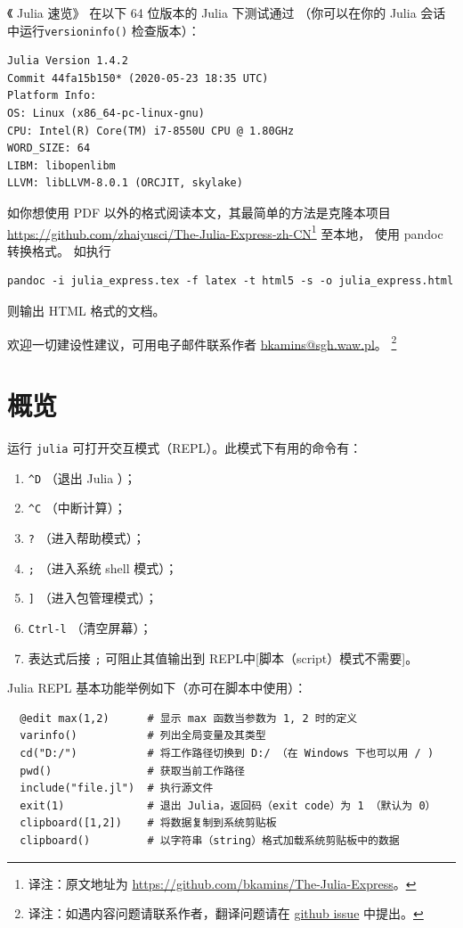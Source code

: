 \documentclass[10pt,a4paper]{article}
\begin{document}
《 Julia 速览》 在以下 64 位版本的 Julia 下测试通过
（你可以在你的 Julia 会话中运行\lstinline|versioninfo()| 检查版本）：
\begin{lstlisting}
Julia Version 1.4.2
Commit 44fa15b150* (2020-05-23 18:35 UTC)
Platform Info:
OS: Linux (x86_64-pc-linux-gnu)
CPU: Intel(R) Core(TM) i7-8550U CPU @ 1.80GHz
WORD_SIZE: 64
LIBM: libopenlibm
LLVM: libLLVM-8.0.1 (ORCJIT, skylake)
\end{lstlisting}

如你想使用 PDF 以外的格式阅读本文，其最简单的方法是克隆本项目
\sloppy\url{https://github.com/zhaiyusci/The-Julia-Express-zh-CN}\footnote{译注：原文地址为 \url{https://github.com/bkamins/The-Julia-Express}。}
至本地，
使用 pandoc 转换格式。
如执行
\begin{lstlisting}
pandoc -i julia_express.tex -f latex -t html5 -s -o julia_express.html
\end{lstlisting}
则输出 HTML 格式的文档。

欢迎一切建设性建议，可用电子邮件联系作者 \href{mailto:bkamins@sgh.waw.pl}{bkamins@sgh.waw.pl}。
\footnote{译注：如遇内容问题请联系作者，翻译问题请在 \href{https://github.com/zhaiyusci/The-Julia-Express-zh-CN/issues}{github issue} 中提出。}

\section{概览}

运行 \lstinline|julia| 可打开交互模式（REPL）。此模式下有用的命令有：
\begin{enumerate}[label=\arabic*),nolistsep]
  \item \lstinline|^D| （退出 Julia ）；
  \item \lstinline|^C| （中断计算）；
  \item \lstinline|?| （进入帮助模式）；
  \item \lstinline|;| （进入系统 shell 模式）；
  \item \lstinline|]| （进入包管理模式）；
  \item \lstinline|Ctrl-l| （清空屏幕）；
  \item 表达式后接 \lstinline|;| 可阻止其值输出到 REPL中[脚本（script）模式不需要]。
\end{enumerate}

Julia REPL 基本功能举例如下（亦可在脚本中使用）：
\begin{lstlisting}
  @edit max(1,2)      # 显示 max 函数当参数为 1, 2 时的定义
  varinfo()           # 列出全局变量及其类型
  cd("D:/")           # 将工作路径切换到 D:/ （在 Windows 下也可以用 / )
  pwd()               # 获取当前工作路径
  include("file.jl")  # 执行源文件
  exit(1)             # 退出 Julia，返回码（exit code）为 1 （默认为 0）
  clipboard([1,2])    # 将数据复制到系统剪贴板
  clipboard()         # 以字符串（string）格式加载系统剪贴板中的数据
\end{lstlisting}
\end{document}
